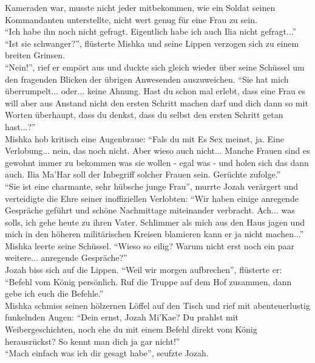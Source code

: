 Kameraden war, musste nicht jeder mitbekommen, wie ein Soldat seinen Kommandanten unterstellte, 
nicht wert genug für eine Frau zu sein.\\
``Ich habe ihn noch nicht gefragt. Eigentlich habe ich auch Ilia nicht gefragt...''\\
``Ist sie schwanger?'', flüsterte Mishka und seine Lippen verzogen sich zu einem breiten Grinsen.\\
``Nein!'', rief er empört aus und duckte sich gleich wieder über seine Schüssel um den fragenden 
Blicken der übrigen Anwesenden auszuweichen. ``Sie hat mich überrumpelt... oder... keine Ahnung. 
Hast du schon mal erlebt, dass eine Frau es will aber aus Anstand nicht den ersten Schritt machen 
darf und dich dann so mit Worten überhaupt, dass du denkst, dass du selbst den ersten Schritt getan 
hast...?''\\
Mishka hob kritisch eine Augenbraue: ``Fals du mit Es Sex meinst, ja. Eine Verlobung... nein, das 
noch nicht. Aber wieso auch nicht... Manche Frauen sind es gewohnt immer zu bekommen was sie wollen 
- egal was - und holen sich das dann auch. Ilia Ma'Har soll der Inbegriff solcher Frauen sein. 
Gerüchte zufolge.''\\
``Sie ist eine charmante, sehr hübsche junge Frau'', murrte Jozah verärgert und verteidigte die 
Ehre seiner inoffiziellen Verlobten: ``Wir haben einige anregende Gespräche geführt und schöne 
Nachmittage miteinander verbracht. Ach... was solls, ich gehe heute zu ihren Vater. Schlimmer als 
mich aus den Haus jagen und mich in den höheren militärischen Kreisen blamieren kann er ja nicht 
machen...''\\
Mishka leerte seine Schüssel. ``Wieso so eilig? Warum nicht erst noch ein paar weitere... anregende 
Gespräche?''\\
Jozah biss sich auf die Lippen. ``Weil wir morgen aufbrechen'', flüsterte er: ``Befehl vom König 
persönlich. Ruf die Truppe auf dem Hof zusammen, dann gebe ich euch die Befehle.''\\
Mishka schmiss seinen hölzernen Löffel auf den Tisch und rief mit abenteuerlustig funkelnden Augen: 
``Dein ernst, Jozah Mi'Kae? Du prahlst mit Weibergeschichten, noch ehe du mit einem Befehl direkt 
vom König herausrückst? So kennt man dich ja gar nicht!''\\
``Mach einfach was ich dir gesagt habe'', seufzte Jozah.\\

